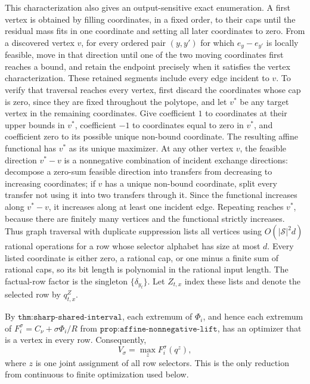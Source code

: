 This characterization also gives an output-sensitive exact enumeration.  A first vertex is obtained by filling coordinates, in a fixed order, to their caps until the residual mass fits in one coordinate and setting all later coordinates to zero.  From a discovered vertex \(v\), for every ordered pair \((y,y')\) for which \(e_y-e_{y'}\) is locally feasible, move in that direction until one of the two moving coordinates first reaches a bound, and retain the endpoint precisely when it satisfies the vertex characterization.  These retained segments include every edge incident to \(v\).  To verify that traversal reaches every vertex, first discard the coordinates whose cap is zero, since they are fixed throughout the polytope, and let \(v^*\) be any target vertex in the remaining coordinates.  Give coefficient \(1\) to coordinates at their upper bounds in \(v^*\), coefficient \(-1\) to coordinates equal to zero in \(v^*\), and coefficient zero to its possible unique non-bound coordinate.  The resulting affine functional has \(v^*\) as its unique maximizer.  At any other vertex \(v\), the feasible direction \(v^*-v\) is a nonnegative combination of incident exchange directions: decompose a zero-sum feasible direction into transfers from decreasing to increasing coordinates; if \(v\) has a unique non-bound coordinate, split every transfer not using it into two transfers through it.  Since the functional increases along \(v^*-v\), it increases along at least one incident edge.  Repeating reaches \(v^*\), because there are finitely many vertices and the functional strictly increases.  Thus graph traversal with duplicate suppression lists all vertices using \(O(|\mathcal S|^2d)\) rational operations for a row whose selector alphabet has size at most \(d\).  Every listed coordinate is either zero, a rational cap, or one minus a finite sum of rational caps, so its bit length is polynomial in the rational input length.  The factual-row factor is the singleton \(\{\delta_{y_t}\}\).  Let \(Z_{t,x}\) index these lists and denote the selected row by \(q^{Z}_{t,x}\).

By \(\texttt{thm:sharp-shared-interval}\), each extremum of \(\Phi_i\), and hence each extremum of \(F_i^\sigma=C_\nu+\sigma\Phi_i/R\) from \(\texttt{prop:affine-nonnegative-lift}\), has an optimizer that is a vertex in every row.  Consequently,
\[
 V_\sigma=\max_z F_i^\sigma(q^z),
\]
where \(z\) is one joint assignment of all row selectors.  This is the only reduction from continuous to finite optimization used below.

